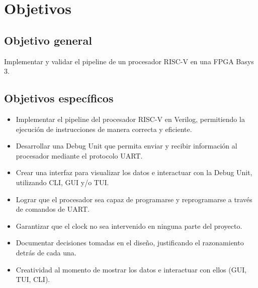 \newpage

\section{Objetivos}

\subsection{Objetivo general}

Implementar y validar el pipeline de un procesador RISC-V en una FPGA Basys 3.

\subsection{Objetivos específicos}

\begin{itemize}
    \item Implementar el pipeline del procesador RISC-V en Verilog, permitiendo la ejecución de instrucciones de manera correcta y eficiente.
    \item Desarrollar una Debug Unit que permita enviar y recibir información al procesador mediante el protocolo UART.
    \item Crear una interfaz para visualizar los datos e interactuar con la Debug Unit, utilizando CLI, GUI y/o TUI.
    \item Lograr que el procesador sea capaz de programarse y reprogramarse a través de comandos de UART.
    \item Garantizar que el clock no sea intervenido en ninguna parte del proyecto.
    \item Documentar decisiones tomadas en el diseño, justificando el razonamiento detrás de cada una.
    \item Creatividad al momento de mostrar los datos e interactuar con ellos (GUI, TUI, CLI).
\end{itemize}
